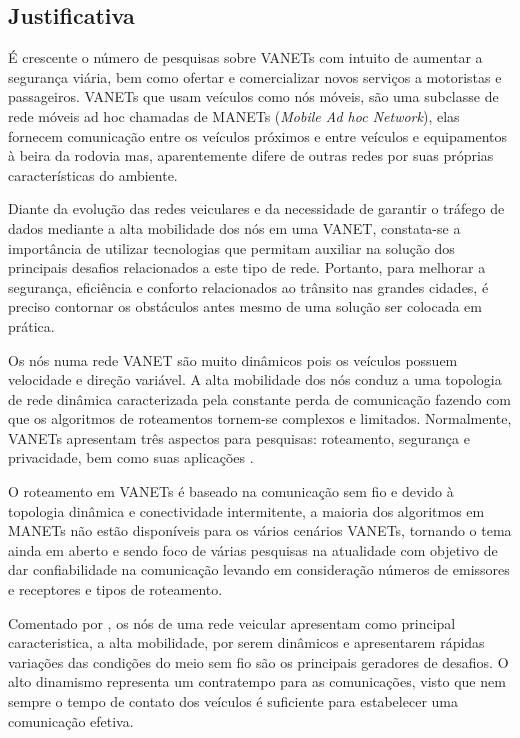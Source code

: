 \documentclass[
	12pt,				%
	oneside,			%
	a4paper,			%
	english,			%
	brazil				%
	]{abntex2ppgsi}
\begin{document}
\subsection{Justificativa}

É crescente o número de pesquisas sobre VANETs  com intuito de aumentar a segurança viária, bem como ofertar e comercializar novos serviços a motoristas e passageiros. VANETs que usam veículos como nós móveis, são uma subclasse de rede móveis ad hoc chamadas de MANETs (\textit{Mobile Ad hoc Network}), elas fornecem comunicação entre os veículos próximos e entre veículos  e equipamentos à beira da rodovia mas, aparentemente difere de outras redes por suas próprias características do ambiente. 

Diante da evolução das redes veiculares e da necessidade de garantir o tráfego de dados mediante a alta mobilidade dos nós em uma VANET, constata-se a importância de utilizar tecnologias que permitam auxiliar na solução dos principais desafios relacionados a este tipo de rede.  Portanto, para melhorar a segurança, eficiência e conforto relacionados ao trânsito nas grandes cidades, é preciso contornar os obstáculos  antes mesmo de uma solução ser colocada em prática.  

Os nós numa rede VANET são muito dinâmicos pois os veículos possuem velocidade e direção variável. A alta mobilidade dos nós conduz a uma topologia de rede dinâmica caracterizada pela constante perda de comunicação fazendo com que os algoritmos de roteamentos tornem-se complexos e limitados. Normalmente, VANETs apresentam três aspectos para pesquisas: roteamento, segurança e privacidade, bem como suas aplicações \cite{liang2015vehicular}.

O roteamento em VANETs é baseado na comunicação sem fio e devido à topologia dinâmica e conectividade intermitente, a maioria dos algoritmos em MANETs não estão disponíveis para os vários cenários VANETs, tornando o tema ainda em aberto  e sendo foco de várias pesquisas na atualidade com objetivo de dar confiabilidade na comunicação levando em consideração números de emissores e receptores e tipos de roteamento.

Comentado por , os nós de uma rede veicular apresentam como principal caracteristica, a alta mobilidade, por serem dinâmicos e apresentarem rápidas variações das condições do meio sem fio são os principais geradores de desafios.  O alto dinamismo representa um contratempo para as comunicações, visto que nem sempre o tempo de contato dos veículos é suficiente para estabelecer uma comunicação efetiva.
\end{document}
